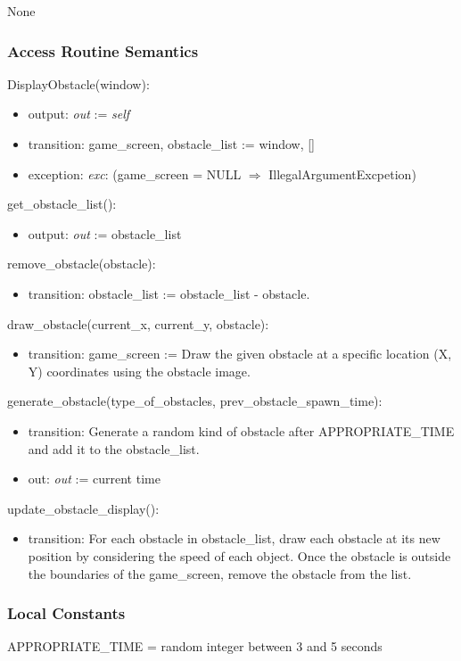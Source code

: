 \documentclass[12pt]{article}
\begin{document}
None

\subsubsection* {Access Routine Semantics}

   DisplayObstacle(window):
\begin{itemize}
    \item output: \textit{out} := \textit{self}
    \item transition: game\_screen, obstacle\_list := window, []
    \item exception: \textit{exc}: (game\_screen = NULL $\Rightarrow$ IllegalArgumentExcpetion)
\end{itemize}
\noindent get\_obstacle\_list():
\begin{itemize}
    \item output: \textit{out} := obstacle\_list
\end{itemize}
\noindent remove\_obstacle(obstacle): 
\begin{itemize}
    \item transition: obstacle\_list := obstacle\_list - obstacle.
\end{itemize}
\noindent draw\_obstacle(current\_x, current\_y, obstacle): 
\begin{itemize}
    \item transition: game\_screen := Draw the given obstacle at a specific location (X, Y) coordinates using the obstacle image.
\end{itemize}
\noindent generate\_obstacle(type\_of\_obstacles, prev\_obstacle\_spawn\_time):
\begin{itemize}
    \item transition: Generate a random kind of obstacle after APPROPRIATE\_TIME and add it to the obstacle\_list. 
    \item out: \textit{out} := current time
\end{itemize}
\noindent update\_obstacle\_display(): 
\begin{itemize}
    \item transition: For each obstacle in obstacle\_list, draw each obstacle at its new position by considering the speed of each object. Once the obstacle is outside the boundaries of the game\_screen, remove the obstacle from the list.
\end{itemize}

\subsubsection* {Local Constants}
APPROPRIATE\_TIME = random integer between 3 and 5 seconds
\newpage 
\end{document}
